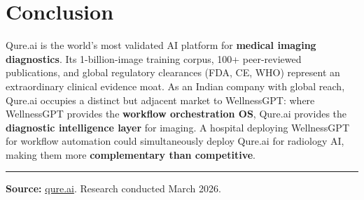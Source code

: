 \documentclass[12pt,a4paper]{article}
\begin{document}
\section{Conclusion}

Qure.ai is the world's most validated AI platform for \textbf{medical imaging diagnostics}. Its 1-billion-image training corpus, 100+ peer-reviewed publications, and global regulatory clearances (FDA, CE, WHO) represent an extraordinary clinical evidence moat. As an Indian company with global reach, Qure.ai occupies a distinct but adjacent market to WellnessGPT: where WellnessGPT provides the \textbf{workflow orchestration OS}, Qure.ai provides the \textbf{diagnostic intelligence layer} for imaging. A hospital deploying WellnessGPT for workflow automation could simultaneously deploy Qure.ai for radiology AI, making them more \textbf{complementary than competitive}.

\vspace{0.5cm}\hrule\vspace{0.3cm}
\small\textbf{Source:} \href{https://qure.ai}{qure.ai}. Research conducted March 2026.
\end{document}
